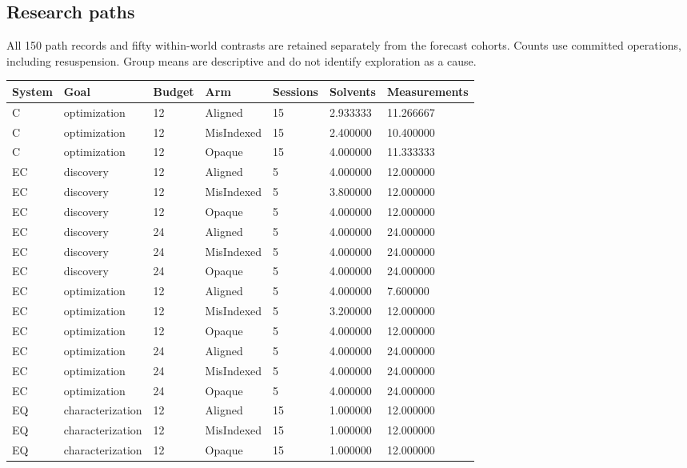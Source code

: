\documentclass[10pt,a4paper]{article}
\begin{document}
\subsection{Research paths}\label{research-paths}

All 150 path records and fifty within-world contrasts are retained separately from the forecast cohorts. Counts use committed operations, including resuspension. Group means are descriptive and do not identify exploration as a cause.

{\def\LTcaptype{table} %
\small\begin{longtable}[]{@{}lllllll@{}}
\toprule\noalign{}
System & Goal & Budget & Arm & Sessions & Solvents & Measurements \\
\midrule\noalign{}
\endhead
\bottomrule\noalign{}
\endlastfoot
C & optimization & 12 & Aligned & 15 & 2.933333 & 11.266667 \\
C & optimization & 12 & MisIndexed & 15 & 2.400000 & 10.400000 \\
C & optimization & 12 & Opaque & 15 & 4.000000 & 11.333333 \\
EC & discovery & 12 & Aligned & 5 & 4.000000 & 12.000000 \\
EC & discovery & 12 & MisIndexed & 5 & 3.800000 & 12.000000 \\
EC & discovery & 12 & Opaque & 5 & 4.000000 & 12.000000 \\
EC & discovery & 24 & Aligned & 5 & 4.000000 & 24.000000 \\
EC & discovery & 24 & MisIndexed & 5 & 4.000000 & 24.000000 \\
EC & discovery & 24 & Opaque & 5 & 4.000000 & 24.000000 \\
EC & optimization & 12 & Aligned & 5 & 4.000000 & 7.600000 \\
EC & optimization & 12 & MisIndexed & 5 & 3.200000 & 12.000000 \\
EC & optimization & 12 & Opaque & 5 & 4.000000 & 12.000000 \\
EC & optimization & 24 & Aligned & 5 & 4.000000 & 24.000000 \\
EC & optimization & 24 & MisIndexed & 5 & 4.000000 & 24.000000 \\
EC & optimization & 24 & Opaque & 5 & 4.000000 & 24.000000 \\
EQ & characterization & 12 & Aligned & 15 & 1.000000 & 12.000000 \\
EQ & characterization & 12 & MisIndexed & 15 & 1.000000 & 12.000000 \\
EQ & characterization & 12 & Opaque & 15 & 1.000000 & 12.000000 \\
\end{longtable}\normalsize
}
\end{document}
